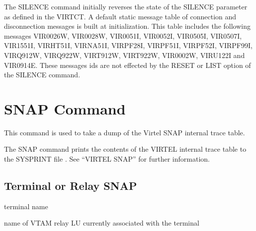 \documentclass[letterpaper,10pt,english]{sphinxmanual}
\begin{document}
\sphinxAtStartPar
The SILENCE command initially reverses the state of the SILENCE parameter as defined in the VIRTCT. A default static message table of connection and disconnection messages is built at initialization. This table includes the following messages \sphinxhyphen{} VIR0026W, VIR0028W, VIR0051I, VIR0052I, VIR0505I, VIR0507I, VIR1551I, VIRHT51I, VIRNA51I, VIRPF28I, VIRPF51I, VIRPF52I, VIRPF99I, VIRQ912W, VIRQ922W, VIRT912W, VIRT922W, VIR0002W, VIRU122I  and VIR0914E. These messages ids are not effected by the RESET or LIST option of the SILENCE command.

\ignorespaces 

\section{SNAP Command}
\label{\detokenize{audit_operations_ and_performance:snap-command}}\label{\detokenize{audit_operations_ and_performance:index-19}}
\sphinxAtStartPar
This command is used to take a dump of the Virtel SNAP internal trace table.

\begin{sphinxVerbatim}[commandchars=\\\{\}]
\end{sphinxVerbatim}

\sphinxAtStartPar
The SNAP command prints the contents of the VIRTEL internal trace table to the SYSPRINT file . See “VIRTEL SNAP” for further information.


\subsection{Terminal or Relay SNAP}
\label{\detokenize{audit_operations_ and_performance:terminal-or-relay-snap}}
\begin{sphinxVerbatim}[commandchars=\\\{\}]
  
\end{sphinxVerbatim}
\begin{description}
\sphinxAtStartPar
terminal name

\sphinxAtStartPar
name of VTAM relay LU currently associated with the terminal

\end{description}
\end{document}
